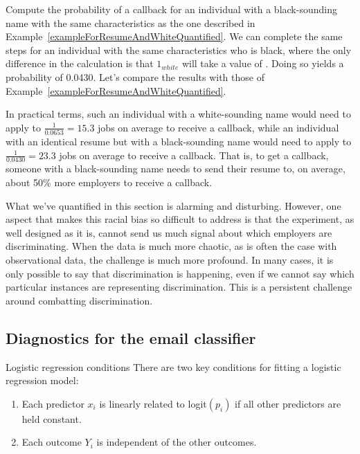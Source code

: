 \begin{examplewrap}
\begin{nexample}{Compute the probability of a callback
    for an individual with a black-sounding name
    with the same characteristics as the one described
    in Example~\ref{exampleForResumeAndWhiteQuantified}.}
  We can complete the same steps for an individual
  with the same characteristics who is black,
  where the only difference in the calculation is that
  $1_{white}$ will take a value of .
  Doing so yields a probability of 0.0430.
  Let's compare the results with those of
  Example~\ref{exampleForResumeAndWhiteQuantified}.

  In practical terms, such an individual with
  a white-sounding name would need to apply to
  $\frac{1}{0.0653} = 15.3$ jobs on average to receive
  a callback,
  while an individual with an identical resume but with
  a black-sounding name would need to apply to
  $\frac{1}{0.0430} = 23.3$ jobs on average to receive
  a callback.
  That is, to get a callback, someone with a
  black-sounding name needs to send their resume to,
  on average,
  about 50\% more employers to receive a callback.
\end{nexample}
\end{examplewrap}

What we've quantified in this section is alarming and disturbing.
However, one aspect that makes this racial bias so difficult to
address is that the experiment, as well designed as it is,
cannot send us much signal about which employers are
discriminating.
When the data is much more chaotic, as is often the case
with observational data, the challenge is much more profound.
In many cases, it is only possible to say that discrimination
is happening, even if we cannot say which particular instances
are representing discrimination.
This is a persistent challenge around combatting discrimination.



\subsection{Diagnostics for the email classifier}

\begin{onebox}{Logistic regression conditions}
There are two key conditions for fitting a logistic regression model:
\begin{enumerate}
\setlength{\itemsep}{0mm}
\item Each predictor $x_i$ is linearly related to logit$(p_i)$ if all other predictors are held constant.
\item Each outcome $Y_i$ is independent of the other outcomes.
\end{enumerate}
\end{onebox}

